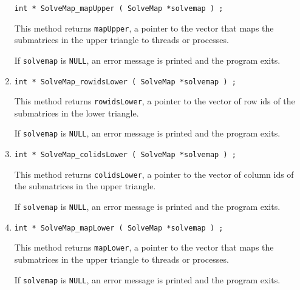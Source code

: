 \begin{enumerate}
\begin{verbatim}
int * SolveMap_mapUpper ( SolveMap *solvemap ) ;
\end{verbatim}
This method returns {\tt mapUpper}, a pointer to the vector that
maps the submatrices in the upper triangle to threads or processes.
\par {}
If {\tt solvemap} is {\tt NULL},
an error message is printed and the program exits.
\item
\begin{verbatim}
int * SolveMap_rowidsLower ( SolveMap *solvemap ) ;
\end{verbatim}
This method returns {\tt rowidsLower}, a pointer to the vector of
row ids of the submatrices in the lower triangle.
\par {}
If {\tt solvemap} is {\tt NULL},
an error message is printed and the program exits.
\item
\begin{verbatim}
int * SolveMap_colidsLower ( SolveMap *solvemap ) ;
\end{verbatim}
This method returns {\tt colidsLower}, a pointer to the vector of
column ids of the submatrices in the upper triangle.
\par {}
If {\tt solvemap} is {\tt NULL},
an error message is printed and the program exits.
\item
\begin{verbatim}
int * SolveMap_mapLower ( SolveMap *solvemap ) ;
\end{verbatim}
This method returns {\tt mapLower}, a pointer to the vector that
maps the submatrices in the upper triangle to threads or processes.
\par {}
If {\tt solvemap} is {\tt NULL},
an error message is printed and the program exits.
\end{enumerate}
\par
